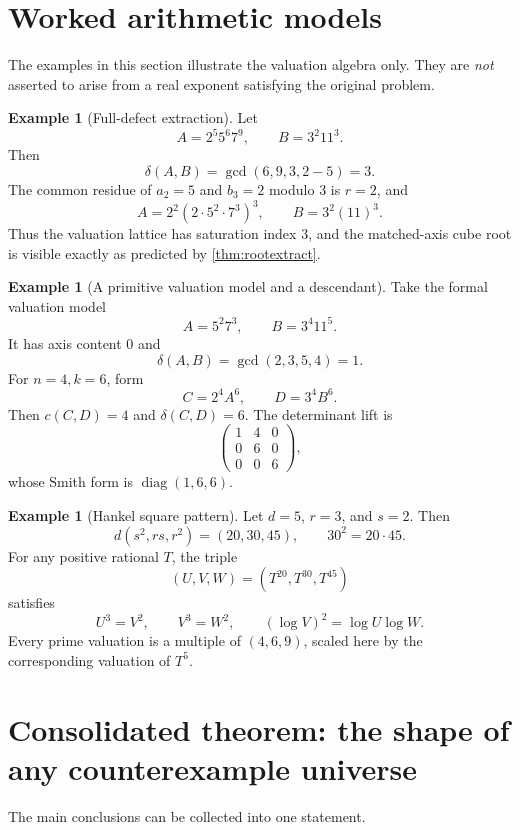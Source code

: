 \documentclass[11pt]{article}
\numberwithin{equation}{section}
\theoremstyle{definition}
\newtheorem{example}[theorem]{Example}
\newcommand{\defect}{\delta}
\begin{document}
\section{Worked arithmetic models}

The examples in this section illustrate the valuation algebra only. They are \emph{not} asserted to arise from a real exponent satisfying the original problem.

\begin{example}[Full-defect extraction]
Let
\[
 A=2^5 5^6 7^9,
 \qquad
 B=3^2 11^3.
\]
Then
\[
 \defect(A,B)=\gcd(6,9,3,2-5)=3.
\]
The common residue of \(a_2=5\) and \(b_3=2\) modulo \(3\) is \(r=2\), and
\[
 A=2^2(2\cdot5^2\cdot7^3)^3,
 \qquad
 B=3^2(11)^3.
\]
Thus the valuation lattice has saturation index \(3\), and the matched-axis cube root is visible exactly as predicted by \cref{thm:rootextract}.
\end{example}

\begin{example}[A primitive valuation model and a descendant]
Take the formal valuation model
\[
 A=5^2 7^3,
 \qquad
 B=3^4 11^5.
\]
It has axis content \(0\) and
\[
 \defect(A,B)=\gcd(2,3,5,4)=1.
\]
For \(n=4,k=6\), form
\[
 C=2^4A^6,
 \qquad
 D=3^4B^6.
\]
Then \(c(C,D)=4\) and \(\defect(C,D)=6\). The determinant lift is
\[
 \begin{pmatrix}
  1&4&0\\
  0&6&0\\
  0&0&6
 \end{pmatrix},
\]
whose Smith form is \(\operatorname{diag}(1,6,6)\).
\end{example}

\begin{example}[Hankel square pattern]
Let \(d=5\), \(r=3\), and \(s=2\). Then
\[
       d(s^2,rs,r^2)=(20,30,45),
       \qquad
       30^2=20\cdot45.
\]
For any positive rational \(T\), the triple
\[
       (U,V,W)=(T^{20},T^{30},T^{45})
\]
satisfies
\[
       U^3=V^2,
       \qquad
       V^3=W^2,
       \qquad
       (\log V)^2=\log U\log W.
\]
Every prime valuation is a multiple of \((4,6,9)\), scaled here by the corresponding valuation of \(T^5\).
\end{example}

\section{Consolidated theorem: the shape of any counterexample universe}

The main conclusions can be collected into one statement.
\end{document}
